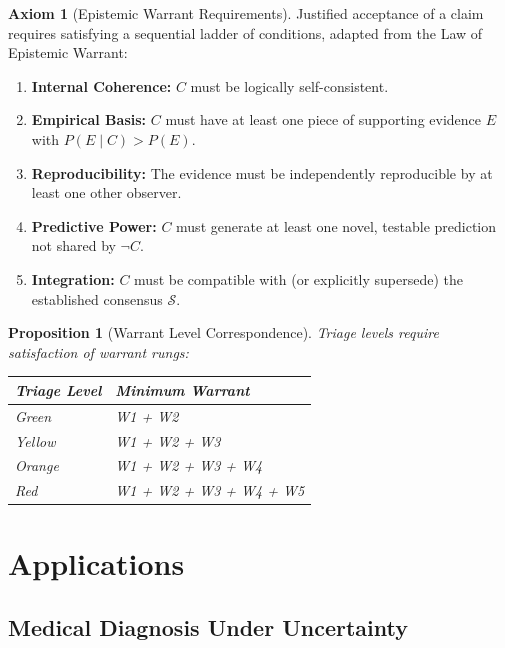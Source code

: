 \documentclass[12pt, a4paper]{article}
\theoremstyle{plain}
\newtheorem{proposition}[theorem]{Proposition}
\theoremstyle{definition}
\newtheorem{axiom}[theorem]{Axiom}
\theoremstyle{remark}
\begin{document}
\begin{axiom}[Epistemic Warrant Requirements]\label{ax:warrant}
  Justified acceptance of a claim requires satisfying a sequential
  ladder of conditions, adapted from the Law of Epistemic Warrant:
  \begin{enumerate}[label=\textbf{W\arabic*:}]
    \item \textbf{Internal Coherence:} $C$ must be logically
      self-consistent.
    \item \textbf{Empirical Basis:} $C$ must have at least one
      piece of supporting evidence $E$ with $P(E \mid C) > P(E)$.
    \item \textbf{Reproducibility:} The evidence must be
      independently reproducible by at least one other observer.
    \item \textbf{Predictive Power:} $C$ must generate at least
      one novel, testable prediction not shared by $\neg C$.
    \item \textbf{Integration:} $C$ must be compatible with (or
      explicitly supersede) the established consensus $\mathcal{S}$.
  \end{enumerate}
\end{axiom}

\begin{proposition}[Warrant Level Correspondence]\label{prop:correspondence}
  Triage levels require satisfaction of warrant rungs:
  \begin{center}
  \begin{tabular}{ll}
    \toprule
    \textbf{Triage Level} & \textbf{Minimum Warrant} \\
    \midrule
    Green & W1 + W2 \\
    Yellow & W1 + W2 + W3 \\
    Orange & W1 + W2 + W3 + W4 \\
    Red & W1 + W2 + W3 + W4 + W5 \\
    \bottomrule
  \end{tabular}
  \end{center}
\end{proposition}

\section{Applications}\label{sec:applications}

\subsection{Medical Diagnosis Under Uncertainty}
\end{document}
